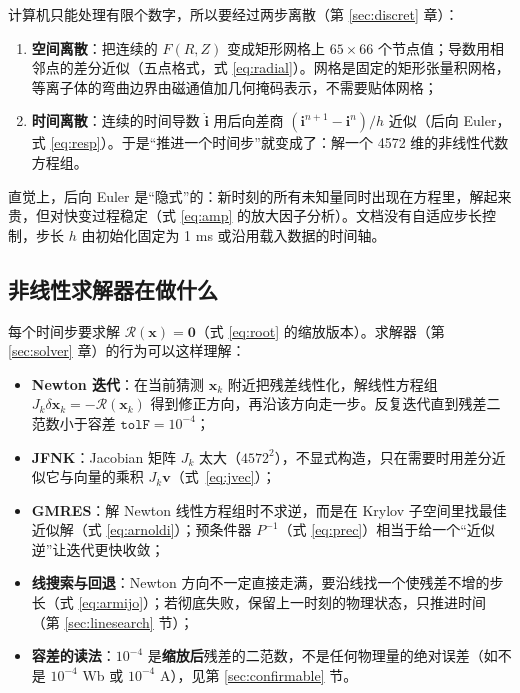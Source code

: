 \documentclass[12pt,fontset=none]{ctexart}
\numberwithin{equation}{section}
\numberwithin{table}{section}
\numberwithin{figure}{section}
\begin{document}
计算机只能处理有限个数字，所以要经过两步离散（第 \ref{sec:discret} 章）：

\begin{enumerate}[nosep]
  \item \textbf{空间离散}：把连续的 $F(R,Z)$ 变成矩形网格上 $65\times66$ 个节点值；导数用相邻点的差分近似（五点格式，式 \eqref{eq:radial}）。网格是固定的矩形张量积网格，等离子体的弯曲边界由磁通值加几何掩码表示，不需要贴体网格；
  \item \textbf{时间离散}：连续的时间导数 $\dot{\bm{i}}$ 用后向差商 $(\bm{i}^{n+1}-\bm{i}^n)/h$ 近似（后向 Euler，式 \eqref{eq:resp}）。于是``推进一个时间步''就变成了：解一个 4572 维的非线性代数方程组。
\end{enumerate}

直觉上，后向 Euler 是``隐式''的：新时刻的所有未知量同时出现在方程里，解起来贵，但对快变过程稳定（式 \eqref{eq:amp} 的放大因子分析）。文档没有自适应步长控制，步长 $h$ 由初始化固定为 1 ms 或沿用载入数据的时间轴。

\subsection{非线性求解器在做什么}\label{sec:primer-solver}

每个时间步要求解 $\bm{\mathcal R}(\bm{x})=\bm{0}$（式 \eqref{eq:root} 的缩放版本）。求解器（第 \ref{sec:solver} 章）的行为可以这样理解：

\begin{itemize}[nosep]
  \item \textbf{Newton 迭代}：在当前猜测 $\bm{x}_k$ 附近把残差线性化，解线性方程组 $J_k\delta\bm{x}_k=-\bm{\mathcal R}(\bm{x}_k)$ 得到修正方向，再沿该方向走一步。反复迭代直到残差二范数小于容差 $\texttt{tolF}=10^{-4}$；
  \item \textbf{JFNK}：Jacobian 矩阵 $J_k$ 太大（$4572^2$），不显式构造，只在需要时用差分近似它与向量的乘积 $J_k\bm{v}$（式~\eqref{eq:jvec}）；
  \item \textbf{GMRES}：解 Newton 线性方程组时不求逆，而是在 Krylov 子空间里找最佳近似解（式 \eqref{eq:arnoldi}）；预条件器 $P^{-1}$（式 \eqref{eq:prec}）相当于给一个``近似逆''让迭代更快收敛；
  \item \textbf{线搜索与回退}：Newton 方向不一定直接走满，要沿线找一个使残差不增的步长（式 \eqref{eq:armijo}）；若彻底失败，保留上一时刻的物理状态，只推进时间（第 \ref{sec:linesearch} 节）；
  \item \textbf{容差的读法}：$10^{-4}$ 是\textbf{缩放后}残差的二范数，不是任何物理量的绝对误差（如不是 $10^{-4}$ Wb 或 $10^{-4}$ A），见第 \ref{sec:confirmable} 节。
\end{itemize}
\end{document}
